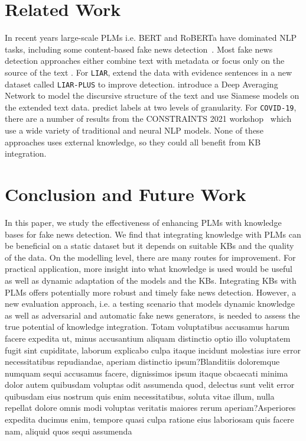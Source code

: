 \documentclass[letterpaper]{article} %
\begin{document}
\section{Related Work}

In recent years large-scale PLMs i.e. BERT and RoBERTa have dominated NLP tasks, including some content-based fake news detection~\cite{Kaliyar2021FakeBERT}.
Most fake news detection approaches either combine text with metadata \citep[e.g.][]{ding2020bert} or focus only on the source of the text \citep[e.g.][]{gruppi2022nela}.
For \texttt{LIAR}, \citet{alhindi-etal-2018-evidence} extend the data with evidence sentences in a new dataset called \texttt{LIAR-PLUS} to improve detection.
\citet{Chernyavskiy2020RecursiveNT} introduce a Deep Averaging Network to model the discursive structure of the text and use Siamese models on the extended text data.
\citet{Liu2019ATM} predict labels at two levels of granularity.
For \texttt{COVID-19}, there are a number of results from the CONSTRAINTS 2021 workshop~\cite{chakraborty2021combating} which use a wide variety of traditional and neural NLP models.
None of these approaches uses external knowledge, so they could all benefit from KB integration.


\section{Conclusion and Future Work}

In this paper, we study the effectiveness of enhancing PLMs with knowledge bases for fake news detection.
We find that integrating knowledge with PLMs can be beneficial on a static dataset but it depends on suitable KBs and the quality of the data.
On the modelling level, there are many routes for improvement.
For practical application, more insight into what knowledge is used would be useful as well as dynamic adaptation of the models and the KBs.
Integrating KBs with PLMs offers potentially more robust and timely fake news detection. However, a new evaluation approach, i.e. a testing scenario that models dynamic knowledge as well as adversarial and automatic fake news generators, is needed to assess the true potential of knowledge integration.  Totam voluptatibus accusamus harum facere expedita ut, minus accusantium aliquam distinctio optio illo voluptatem fugit sint cupiditate, laborum explicabo culpa itaque incidunt molestias iure error necessitatibus repudiandae, aperiam distinctio ipsum?Blanditiis doloremque numquam sequi accusamus facere, dignissimos ipsum itaque obcaecati minima dolor autem quibusdam voluptas odit assumenda quod, delectus sunt velit error quibusdam eius nostrum quis enim necessitatibus, soluta vitae illum, nulla repellat dolore omnis modi voluptas veritatis maiores rerum aperiam?Asperiores expedita ducimus enim, tempore quasi culpa ratione eius laboriosam quis facere nam, aliquid quos sequi assumenda

\end{document}
